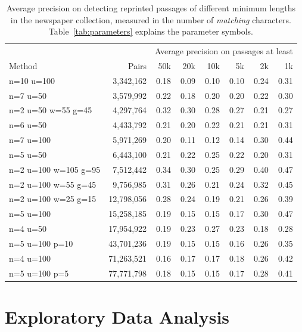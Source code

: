 \documentclass[pdftex,11pt]{article}
\begin{document}
\begin{table}
  \small
  \centering
  \caption{Average precision on detecting reprinted passages of
    different minimum lengths in the newspaper collection, measured in the number of
    \emph{matching} characters.  Table~\ref{tab:parameters} explains
    the parameter symbols.}
  \label{tab:newspapers-ap}
  \begin{tabular}{l r r r r r r r}
    & & \multicolumn{6}{c}{Average precision on passages at least} \\
    Method & Pairs & 50k & 20k & 10k & 5k & 2k & 1k \\ \hline
n=10 u=100 & 3,342,162 & 0.18 & 0.09 & 0.10 & 0.10 & 0.24 & 0.31 \\
n=7 u=50 & 3,579,992 & 0.22 & 0.18 & 0.20 & 0.20 & 0.22 & 0.30 \\
n=2 u=50 w=55 g=45 & 4,297,764 & 0.32 & 0.30 & 0.28 & 0.27 & 0.21 &
0.27 \\
n=6 u=50      & 4,433,792 & 0.21 & 0.20 & 0.22 & 0.21 & 0.21 &
0.31 \\
n=7 u=100      & 5,971,269 & 0.20 & 0.11 & 0.12 & 0.14 & 0.30 &
0.44 \\
n=5 u=50      & 6,443,100 & 0.21 & 0.22 & 0.25 & 0.22 & 0.20 &
0.31 \\
n=2 u=100 w=105 g=95      & 7,512,442 & 0.34 & 0.30 & 0.25 & 0.29 &
0.40 & 0.47 \\
n=2 u=100 w=55 g=45       & 9,756,985 & 0.31 & 0.26 & 0.21 & 0.24 &
0.32 & 0.45 \\
n=2 u=100 w=25 g=15       & 12,798,056 & 0.28 & 0.24 & 0.19 & 0.21
& 0.26 & 0.39 \\
n=5 u=100     & 15,258,185 & 0.19 & 0.15 & 0.15 & 0.17 & 0.30 &
0.47 \\
n=4 u=50      & 17,954,922 & 0.19 & 0.23 & 0.27 & 0.23 & 0.18 &
0.28 \\
n=5 u=100 p=10  & 43,701,236 & 0.19 & 0.15 & 0.15 & 0.16 & 0.26 &
0.35 \\
n=4 u=100      & 71,263,521 & 0.16 & 0.17 & 0.17 & 0.18 & 0.26 &
0.42 \\
n=5 u=100 p=5   & 77,771,798 & 0.18 & 0.15 & 0.15 & 0.17 & 0.28 &
0.41 \\
  \end{tabular}
\end{table}

\section{Exploratory Data Analysis}
\label{sec:eda}
\end{document}
